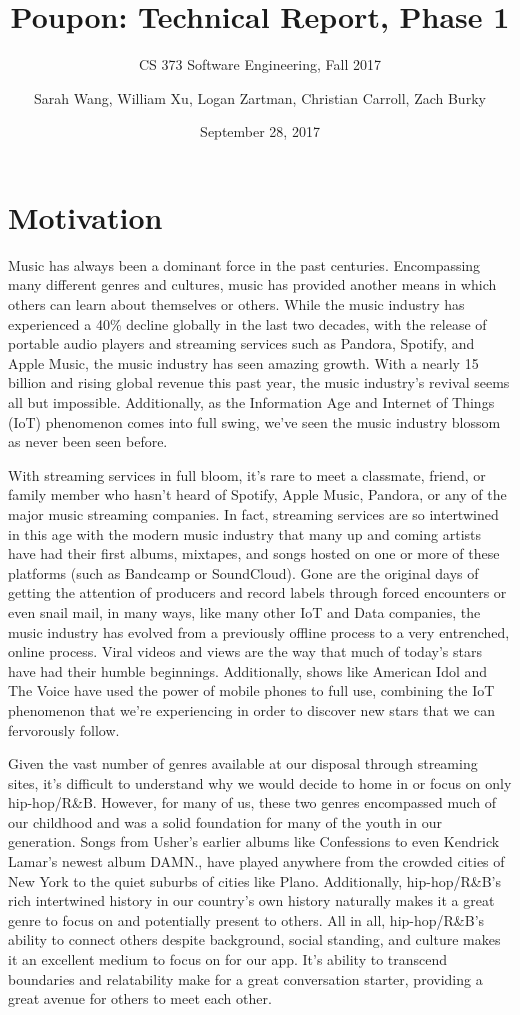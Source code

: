 \documentclass{scrartcl}
\title{Poupon: Technical Report, Phase 1}
\subtitle{CS 373 Software Engineering, Fall 2017}
\author{Sarah Wang, William Xu, Logan Zartman, Christian Carroll, Zach Burky}
\date{September 28, 2017}
\begin{document}
\maketitle

\tableofcontents

\newpage
\section{Motivation}
\indent
Music has always been a dominant force in the past centuries. Encompassing many different genres and cultures, music has provided another means in which others can learn about themselves or others. While the music industry has experienced a 40\% decline globally in the last two decades, with the release of portable audio players and streaming services such as Pandora, Spotify, and Apple Music, the music industry has seen amazing growth. With a nearly 15 billion and rising global revenue this past year, the music industry’s revival seems all but impossible. Additionally, as the Information Age and Internet of Things (IoT) phenomenon comes into full swing, we’ve seen the music industry blossom as never been seen before.

With streaming services in full bloom, it’s rare to meet a classmate, friend, or family member who hasn’t heard of Spotify, Apple Music, Pandora, or any of the major music streaming companies. In fact, streaming services are so intertwined in this age with the modern music industry that many up and coming artists have had their first albums, mixtapes, and songs hosted on one or more of these platforms (such as Bandcamp or SoundCloud). Gone are the original days of getting the attention of producers and record labels through forced encounters or even snail mail, in many ways, like many other IoT and Data companies, the music industry has evolved from a previously offline process to a very entrenched, online process. Viral videos and views are the way that much of today’s stars have had their humble beginnings. Additionally, shows like American Idol and The Voice have used the power of mobile phones to full use, combining the IoT phenomenon that we're experiencing in order to discover new stars that we can fervorously follow.

Given the vast number of genres available at our disposal through streaming sites, it’s difficult to understand why we would decide to home in or focus on only hip-hop/R\&B. However, for many of us, these two genres encompassed much of our childhood and was a solid foundation for many of the youth in our generation. Songs from Usher’s earlier albums like Confessions to even Kendrick Lamar’s newest album DAMN., have played anywhere from the crowded cities of New York to the quiet suburbs of cities like Plano. Additionally, hip-hop/R\&B’s rich intertwined history in our country’s own history naturally makes it a great genre to focus on and potentially present to others. All in all, hip-hop/R\&B’s ability to connect others despite background, social standing, and culture makes it an excellent medium to focus on for our app. It’s ability to transcend boundaries and relatability make for a great conversation starter, providing a great avenue for others to meet each other.
\end{document}
